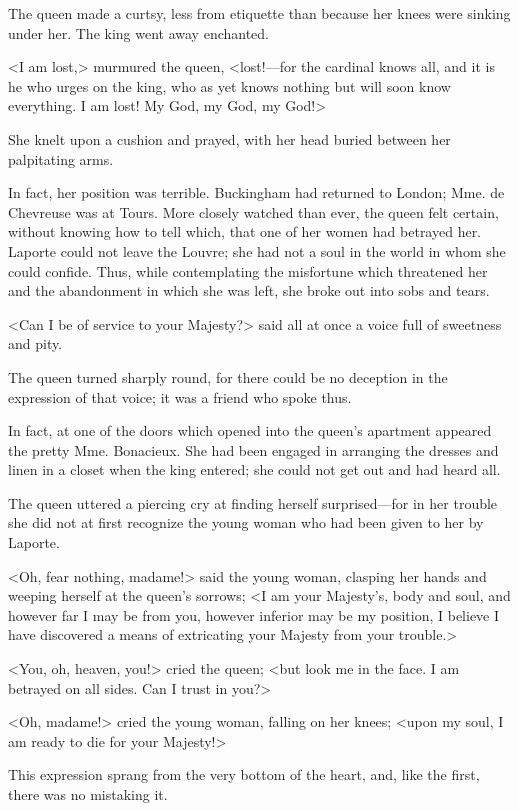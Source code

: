 The queen made a curtsy, less from etiquette than because her knees were sinking under her. The king went away enchanted. 

<I am lost,> murmured the queen, <lost!---for the cardinal knows all, and it is he who urges on the king, who as yet knows nothing but will soon know everything. I am lost! My God, my God, my God!> 

She knelt upon a cushion and prayed, with her head buried between her palpitating arms. 

In fact, her position was terrible. Buckingham had returned to London; Mme. de Chevreuse was at Tours. More closely watched than ever, the queen felt certain, without knowing how to tell which, that one of her women had betrayed her. Laporte could not leave the Louvre; she had not a soul in the world in whom she could confide. Thus, while contemplating the misfortune which threatened her and the abandonment in which she was left, she broke out into sobs and tears. 

<Can I be of service to your Majesty?> said all at once a voice full of sweetness and pity. 

The queen turned sharply round, for there could be no deception in the expression of that voice; it was a friend who spoke thus. 

In fact, at one of the doors which opened into the queen's apartment appeared the pretty Mme. Bonacieux. She had been engaged in arranging the dresses and linen in a closet when the king entered; she could not get out and had heard all. 

The queen uttered a piercing cry at finding herself surprised---for in her trouble she did not at first recognize the young woman who had been given to her by Laporte. 

<Oh, fear nothing, madame!> said the young woman, clasping her hands and weeping herself at the queen's sorrows; <I am your Majesty's, body and soul, and however far I may be from you, however inferior may be my position, I believe I have discovered a means of extricating your Majesty from your trouble.> 

<You, oh, heaven, you!> cried the queen; <but look me in the face. I am betrayed on all sides. Can I trust in you?> 

<Oh, madame!> cried the young woman, falling on her knees; <upon my soul, I am ready to die for your Majesty!> 

This expression sprang from the very bottom of the heart, and, like the first, there was no mistaking it. 

